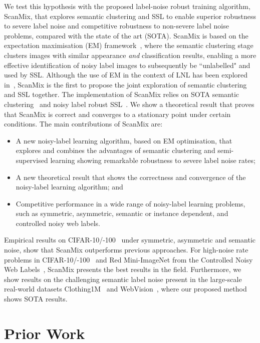 \documentclass[review]{elsarticle}
\theoremstyle{plain}
\begin{document}
We test this hypothesis with the proposed label-noise robust training algorithm, ScanMix, that explores semantic clustering and SSL to 
enable superior robustness to severe label noise and competitive robustness to non-severe label noise problems, compared with the state of the art (SOTA).
ScanMix is based on the expectation maximisation (EM) framework~\citep{dempster1977maximum}, where the semantic clustering stage clusters images with similar appearance \textit{and} classification results, enabling a more effective identification of noisy label images to subsequently be ``unlabelled" and used by SSL.
Although the use of EM in the context of LNL has been explored in~\citep{rebbapragada2007class}, ScanMix is the first to propose the joint exploration of semantic clustering and SSL together.
The implementation of ScanMix relies on SOTA semantic clustering~\citep{SCAN} and noisy label robust SSL~\citep{li2020dividemix}.
We show a theoretical result that proves that ScanMix is correct and converges to a stationary point under certain conditions. The main contributions of ScanMix are:
\begin{itemize}
    \item A new noisy-label learning algorithm, based on EM optimisation, that explores and combines the advantages of semantic clustering and semi-supervised learning showing remarkable robustness to severe label noise rates; 
    \item A new theoretical result that shows the correctness and convergence of the noisy-label learning algorithm; and
    \item Competitive performance in a wide range of noisy-label learning problems, such as symmetric, asymmetric, semantic or instance dependent, and controlled noisy web labels.
\end{itemize}
Empirical results on CIFAR-10/-100~\citep{krizhevsky2009learning} under symmetric, asymmetric and semantic 
noise, show that ScanMix outperforms  previous approaches. 
For high-noise rate problems in CIFAR-10/-100~\citep{li2020dividemix} and 
Red Mini-ImageNet from the Controlled Noisy Web Labels~\citep{FaMUS}, ScanMix presents the best results in the field. 
Furthermore, we show results on the challenging semantic label noise present in the large-scale real-world datasets Clothing1M~\citep{xiao2015learning} and WebVision~\citep{li2017webvision}, where our proposed method shows SOTA results.




\section{Prior Work}
\label{sec:prior_work}
\end{document}
